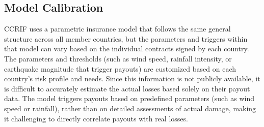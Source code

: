 \documentclass[fleqn,mnsc,nonblindrev]{informs4}
\let\footnote=\endnote
\begin{document}


\subsection{Model Calibration}\label{app:ccrif_tc_year_info}
CCRIF uses a parametric insurance model that follows the same general structure across all member countries, but the parameters and triggers within that model can vary based on the individual contracts signed by each country. The parameters and thresholds (such as wind speed, rainfall intensity, or earthquake magnitude that trigger payouts) are customized based on each country’s risk profile and needs. Since this information is not publicly available, it is difficult to accurately estimate the actual losses based solely on their payout data. The model triggers payouts based on predefined parameters (such as wind speed or rainfall), rather than on detailed assessments of actual damage, making it challenging to directly correlate payouts with real losses. 
\end{document}
